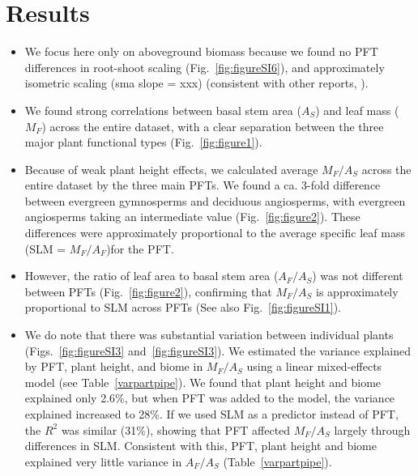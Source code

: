 \documentclass[a4paper]{article}\usepackage[]{graphicx}\usepackage[]{color}
\begin{document}
\section{Results}

\begin{itemize}

\item We focus here only on aboveground biomass because we found no PFT differences in root-shoot scaling (Fig.~\ref{fig:figureSI6}), and approximately isometric scaling (sma slope = xxx) (consistent with other reports, \cite{hui_near_2014, cairns_root_1997}).

\item We found strong correlations between basal stem area ($A_S$) and leaf mass ($M_F$) across the entire dataset, with a clear separation between the three major plant functional types (Fig.~\ref{fig:figure1}). 

\item Because of weak plant height effects, we calculated average $M_F/A_S$ across the entire dataset by the three main PFTs. We found a ca. 3-fold difference between evergreen gymnosperms and deciduous angiosperms, with evergreen angiosperms taking an intermediate value (Fig.~\ref{fig:figure2}). These differences were approximately proportional to the average specific leaf mass (SLM = $M_F / A_F$)for the PFT. 

\item However, the ratio of leaf area to basal stem area ($A_F/A_S$) was not different between PFTs (Fig.~\ref{fig:figure2}), confirming that $M_F/A_S$ is approximately proportional to SLM across PFTs (See also Fig.~\ref{fig:figureSI1}).

\item We do note that there was substantial variation between individual plants (Figs.~\ref{fig:figureSI3} and~\ref{fig:figureSI3}). We estimated the variance explained by PFT, plant height, and biome in $M_F/A_S$ using a linear mixed-effects model (see Table~\ref{varpartpipe}). We found that plant height and biome explained only 2.6\%, but when PFT was added to the model, the variance explained increased to 28\%. If we used SLM as a predictor instead of PFT, the $R^2$ was similar (31\%), showing that PFT affected $M_F/A_S$ largely through differences in SLM. Consistent with this, PFT, plant height and biome explained very little variance in $A_F/A_S$ (Table~\ref{varpartpipe}).


\end{itemize}
\end{document}
